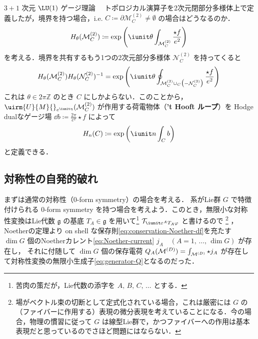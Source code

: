 \documentclass[TQFT_main]{subfiles}
\begin{document}
\begin{myexample}[label=ex:3-2]{$3+1$ 次元 $\LU(1)$ ゲージ理論}
    　トポロジカル演算子を2次元閉部分多様体上で定義したが，境界を持つ場合，i.e. $C \coloneqq \partial \mathcal{M}^{(2)}_C \neq \emptyset$ の場合はどうなるのか．
    \begin{align}
        H_\theta(\mathcal{M}^{(2)}_C) \coloneqq \exp \left( \iunit \theta \int_{\mathcal{M}^{(2)}_C} \frac{\star f}{e^2} \right)
    \end{align}
    を考える．境界を共有するもう1つの2次元部分多様体 $\mathcal{N}^{(2)}_C$ を持ってくると
    \begin{align}
        H_\theta(\mathcal{M}^{(2)}_C)H_\theta(\mathcal{N}^{(2)}_C)^{-1} = \exp \left( \iunit \theta \oint_{\mathcal{M}^{(2)}_C \cup_C \bigl(- \mathcal{N}^{(2)}_C\bigr)} \frac{\star f}{e^2} \right)
    \end{align}
    これは $\theta \in 2\pi \mathbb{Z}$ のとき $C$ にしかよらない．このことから，$\uirm{U}{M}{}_{e^{\iunit \eta}}(\mathcal{M}^{(2)}_C)$ が作用する荷電物体（\textbf{'t Hooft ループ}）を
    Hodge dualなゲージ場 $\dd{b} \coloneqq \frac{2\pi}{e^2} \star f$ によって
    \begin{align}
        H_n (C) \coloneqq \exp \left( \iunit n \int_C b \right) 
    \end{align}
    と定義できる．

\end{myexample}

\subsection{対称性の自発的破れ}

まずは通常の対称性（$0$-form symmetry）の場合を考える．
系がLie群 $G$ で特徴付けられる $0$-form symmetry を持つ場合を考えよう．このとき，無限小な対称性変換はLie代数 $\mathfrak{g}$ の基底 $T_A \in \mathfrak{g}$ を用いて\footnote{苦肉の策だが，Lie代数の添字を $A,\, B,\, C,\, \dots$ とする．} 
$\mathcal{T}_{\iunit\varepsilon^A T_A \varphi}$ と書けるので
\footnote{場がベクトル束の切断として定式化されている場合，これは厳密には $G$ の（ファイバーに作用する）表現の微分表現を考えていることになる．今の場合，物理の慣習に従って $G$ は線型Lie群で，かつファイバーへの作用は基本表現だと思っているのでさほど問題にはならない．}
，Noetherの定理より on shell な保存則\eqref{eq:conservation-Noether-df}を充たす $\dim G$ 個のNoetherカレント\eqref{eq:Noether-current} $j_A\quad (A = 1,\, \dots,\, \dim G)$ が存在し，
それに付随して $\dim G$ 個の保存電荷 $Q_A(\mathcal{M}^{(D)}) = \int_{\mathcal{M}^{(D)}} \star j_A$ が存在して対称性変換の無限小生成子\eqref{eq:generator-Q}となるのだった．
\end{document}
